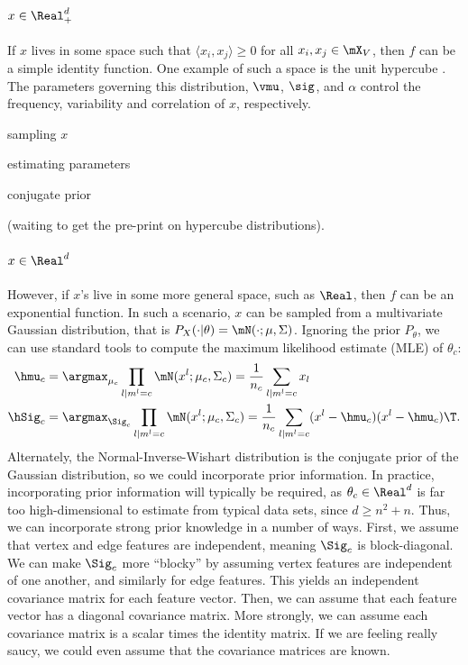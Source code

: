 \documentclass{article}
\begin{document}
\paragraph{$x \in \Real^d_+$}

If $x$ lives in some space such that $\langle x_i, x_j \rangle \geq 0$ for all $x_i, x_j \in \mX_V$, then $f$ can be a simple identity function.  One example of such a space is the unit hypercube \cite{?}. The parameters governing this distribution, $\vmu$, $\sig$, and $\alpha$ control the frequency, variability and correlation of $x$, respectively. 

sampling $x$

estimating parameters

conjugate prior

(waiting to get the pre-print on hypercube distributions).  

\paragraph{$x \in \Real^d$}

However, if $x$'s live in some more general space, such as $\Real$, then $f$ can be an exponential function.  In such a scenario, $x$ can be sampled from a multivariate Gaussian distribution, that is $P_X( \cdot | \theta)=\mN(\cdot; \mu,\Sigma)$.  Ignoring the prior $P_{\theta}$, we can use standard tools to compute the maximum likelihood estimate (MLE) of $\theta_c$:
\begin{align}
	\hmu_c &= \argmax_{\mu_c} \prod_{l | m^l= c} \mN(x^l; \mu_c, \Sigma_c) = \frac{1}{n_c} \sum_{l | m^l = c} x_l \\
	\hSig_c &= \argmax_{\Sig_c} \prod_{l | m^l= c} \mN(x^l; \mu_c, \Sigma_c) =\frac{1}{n_c} \sum_{l | m^l=c} (x^l - \hmu_c) (x^l -\hmu_c)\T.
\end{align}
Alternately, the Normal-Inverse-Wishart distribution is the conjugate prior of the Gaussian distribution, so we could incorporate prior information. In practice, incorporating prior information will typically be required, as $\theta_c \in \Real^d$ is far too high-dimensional to estimate from typical data sets, since $d \geq n^2+n$.  Thus, we can incorporate strong prior knowledge in a number of ways.  First, we assume that vertex and edge features are independent, meaning $\Sig_c$ is block-diagonal.  We can make $\Sig_c$ more ``blocky'' by assuming vertex features are independent of one another, and similarly for edge features.  This yields an independent covariance matrix for each feature vector.  Then, we can assume that each feature vector has a diagonal covariance matrix. More strongly, we can assume each covariance matrix is a scalar times the identity matrix.  If we are feeling really saucy, we could even assume that the covariance matrices are known.  
\end{document}
